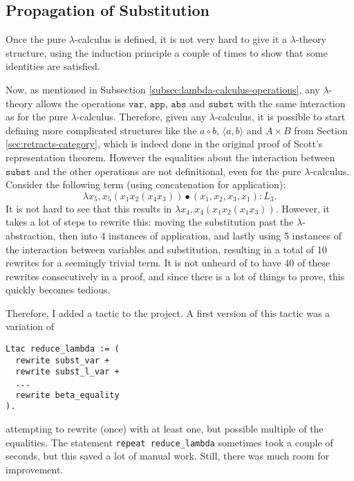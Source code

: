 \subsection{Propagation of Substitution}\label{sec:tactic}
Once the pure $ \lambda $-calculus is defined, it is not very hard to give it a $ \lambda $-theory structure, using the induction principle a couple of times to show that some identities are satisfied.

Now, as mentioned in Subsection \ref{subsec:lambda-calculus-operations}, any $ \lambda $-theory allows the operations $ \mathtt{var} $, $ \mathtt{app} $, $ \mathtt{abs} $ and $ \mathtt{subst} $ with the same interaction as for the pure $ \lambda $-calculus. Therefore, given any $ \lambda $-calculus, it is possible to start defining more complicated structures like the $ a \circ b $, $ \langle a, b \rangle $ and $ A \times B $ from Section \ref{sec:retracts-category}, which is indeed done in the original proof of Scott's representation theorem. However the equalities about the interaction between $ \mathtt{subst} $ and the other operations are not definitional, even for the pure $ \lambda $-calculus. Consider the following term (using concatenation for application):
\[ \lambda x_5, x_5 (x_1 x_2 (x_4 x_3)) \bullet (x_1, x_2, x_3, x_1) : L_3. \]
It is not hard to see that this results in $ \lambda x_4, x_4 (x_1 x_2 (x_1 x_3)) $. However, it takes a lot of steps to rewrite this: moving the substitution past the $ \lambda $-abstraction, then into 4 instances of application, and lastly using 5 instances of the interaction between variables and substitution, resulting in a total of 10 rewrites for a seemingly trivial term. It is not unheard of to have 40 of these rewrites consecutively in a proof, and since there is a lot of things to prove, this quickly becomes tedious.

Therefore, I added a tactic to the project. A first version of this tactic was a variation of
\begin{lstlisting}
Ltac reduce_lambda := (
  rewrite subst_var +
  rewrite subst_l_var +
  ...
  rewrite beta_equality
).
\end{lstlisting}
attempting to rewrite (once) with at least one, but possible multiple of the equalities. The statement \texttt{repeat reduce\_lambda} sometimes took a couple of seconds, but this saved a lot of manual work. Still, there was much room for improvement.

